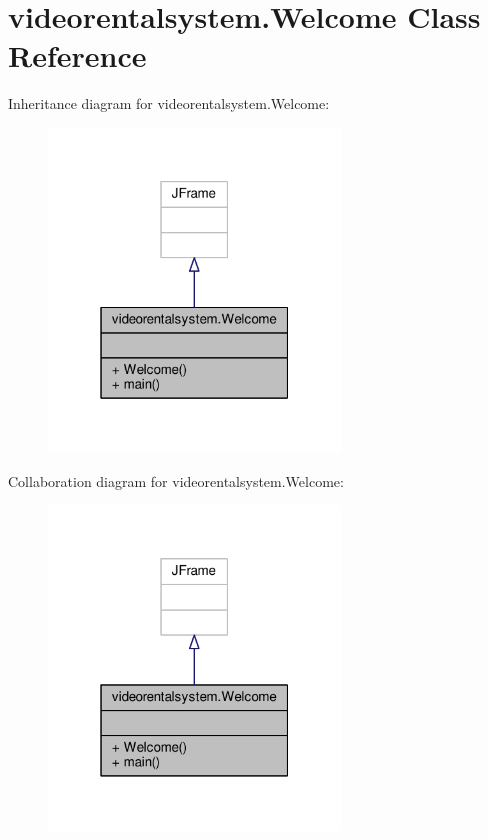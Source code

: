 \hypertarget{classvideorentalsystem_1_1Welcome}{\section{videorentalsystem.\-Welcome Class Reference}
\label{classvideorentalsystem_1_1Welcome}
}


Inheritance diagram for videorentalsystem.\-Welcome\-:
\nopagebreak
\begin{figure}[H]
\begin{center}
\leavevmode
\includegraphics[width=220pt]{classvideorentalsystem_1_1Welcome__inherit__graph}
\end{center}
\end{figure}


Collaboration diagram for videorentalsystem.\-Welcome\-:
\nopagebreak
\begin{figure}[H]
\begin{center}
\leavevmode
\includegraphics[width=220pt]{classvideorentalsystem_1_1Welcome__coll__graph}
\end{center}
\end{figure}
